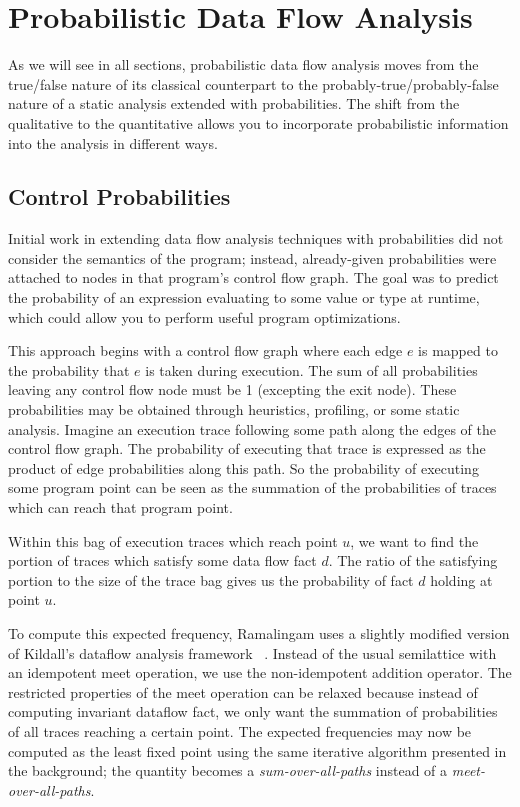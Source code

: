 \section{Probabilistic Data Flow Analysis}
\label{sec:pdfa}

As we will see in all sections, probabilistic data flow
analysis moves from the true/false nature of its classical
counterpart to the probably-true/probably-false nature of
a static analysis extended with probabilities.
The shift from the qualitative to the quantitative allows
you to incorporate probabilistic information into the
analysis in different ways.

\subsection{Control Probabilities}

Initial work in extending data flow analysis 
techniques with probabilities did not consider
the semantics of the program; instead, already-given probabilities 
were attached to nodes in that program's control flow graph.  
The goal was to predict the probability of an expression evaluating 
to some value or type at runtime, which could 
allow you to perform useful program optimizations.

This approach begins with a control flow graph where each edge $e$ is 
mapped to the probability that $e$ is taken during execution.
The sum of all probabilities leaving any control flow node must be 1
(excepting the exit node).
These probabilities may be obtained through heuristics, profiling,
or some static analysis.
Imagine an execution trace following some path along the edges of
the control flow graph.
The probability of executing that trace is expressed as the product of 
edge probabilities along this path.
So the probability of executing some program point can be seen as the
summation of the probabilities of traces which can reach that program
point.


Within this bag of execution traces which reach point $u$, we want to 
find the portion of traces which satisfy some data flow fact $d$.  
The ratio of the satisfying portion to the size of the trace bag
gives us the probability of fact $d$ holding at point $u$.

To compute this expected frequency, Ramalingam uses a slightly
modified version of Kildall's dataflow analysis framework
~\cite{ramalingam1996data}.
Instead of the usual semilattice with an idempotent meet
operation, we use the non-idempotent addition operator.
The restricted properties of the meet operation can be
relaxed because instead of computing invariant dataflow
fact, we only want the summation of probabilities of all
traces reaching a certain point.
The expected frequencies may now be computed as the least
fixed point using the same iterative algorithm presented
in the background; the quantity becomes a
{\sl sum-over-all-paths} instead of a {\sl meet-over-all-paths}.

